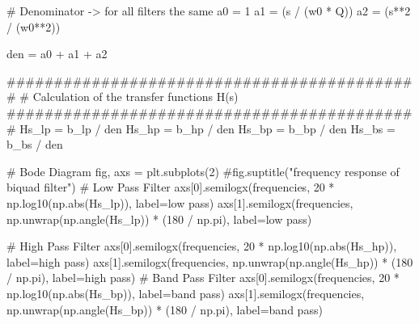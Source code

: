 \documentclass[
  letterpaper,
]{scrbook}
\newenvironment{Shaded}{}{}
\newcommand{\BuiltInTok}[1]{\textcolor[rgb]{0.84,0.23,0.29}{#1}}
\newcommand{\CommentTok}[1]{\textcolor[rgb]{0.42,0.45,0.49}{#1}}
\newcommand{\DecValTok}[1]{\textcolor[rgb]{0.00,0.36,0.77}{#1}}
\newcommand{\NormalTok}[1]{\textcolor[rgb]{0.14,0.16,0.18}{#1}}
\newcommand{\OperatorTok}[1]{\textcolor[rgb]{0.14,0.16,0.18}{#1}}
\newcommand{\StringTok}[1]{\textcolor[rgb]{0.01,0.18,0.38}{#1}}
\begin{document}
\begin{codelisting}
{\begin{Shaded}
\begin{Highlighting}[]
\CommentTok{\# Denominator {-}\textgreater{} for all filters the same}
\NormalTok{a0 }\OperatorTok{=} \DecValTok{1}
\NormalTok{a1 }\OperatorTok{=}\NormalTok{ (s }\OperatorTok{/}\NormalTok{ (w0 }\OperatorTok{*}\NormalTok{ Q))}
\NormalTok{a2 }\OperatorTok{=}\NormalTok{ (s}\OperatorTok{**}\DecValTok{2} \OperatorTok{/}\NormalTok{ (w0}\OperatorTok{**}\DecValTok{2}\NormalTok{))}

\NormalTok{den }\OperatorTok{=}\NormalTok{ a0 }\OperatorTok{+}\NormalTok{ a1 }\OperatorTok{+}\NormalTok{ a2}

\CommentTok{\#\#\#\#\#\#\#\#\#\#\#\#\#\#\#\#\#\#\#\#\#\#\#\#\#\#\#\#\#\#\#\#\#\#\#\#\#\#\#\#\#\#\#\#}
\CommentTok{\# Calculation of the transfer functions H(s)}
\CommentTok{\#\#\#\#\#\#\#\#\#\#\#\#\#\#\#\#\#\#\#\#\#\#\#\#\#\#\#\#\#\#\#\#\#\#\#\#\#\#\#\#\#\#\#\#}
\NormalTok{Hs\_lp }\OperatorTok{=}\NormalTok{ b\_lp }\OperatorTok{/}\NormalTok{ den}
\NormalTok{Hs\_hp }\OperatorTok{=}\NormalTok{ b\_hp }\OperatorTok{/}\NormalTok{ den}
\NormalTok{Hs\_bp }\OperatorTok{=}\NormalTok{ b\_bp }\OperatorTok{/}\NormalTok{ den}
\NormalTok{Hs\_bs }\OperatorTok{=}\NormalTok{ b\_bs }\OperatorTok{/}\NormalTok{ den}

\CommentTok{\# Bode Diagram}
\NormalTok{fig, axs }\OperatorTok{=}\NormalTok{ plt.subplots(}\DecValTok{2}\NormalTok{)}
\CommentTok{\#fig.suptitle("frequency response of biquad filter")}
\CommentTok{\textquotesingle{}\textquotesingle{}\textquotesingle{}}
\CommentTok{\# Low Pass Filter}
\CommentTok{axs[0].semilogx(frequencies, 20 * np.log10(np.abs(Hs\_lp)), label=\textquotesingle{}low pass\textquotesingle{})}
\CommentTok{axs[1].semilogx(frequencies, np.unwrap(np.angle(Hs\_lp)) * (180 / np.pi), label=\textquotesingle{}low pass\textquotesingle{})}

\CommentTok{\# High Pass Filter}
\CommentTok{axs[0].semilogx(frequencies, 20 * np.log10(np.abs(Hs\_hp)), label=\textquotesingle{}high pass\textquotesingle{})}
\CommentTok{axs[1].semilogx(frequencies, np.unwrap(np.angle(Hs\_hp)) * (180 / np.pi), label=\textquotesingle{}high pass\textquotesingle{})}
\CommentTok{\textquotesingle{}\textquotesingle{}\textquotesingle{}}
\CommentTok{\# Band Pass Filter}
\NormalTok{axs[}\DecValTok{0}\NormalTok{].semilogx(frequencies, }\DecValTok{20} \OperatorTok{*}\NormalTok{ np.log10(np.}\BuiltInTok{abs}\NormalTok{(Hs\_bp)), label}\OperatorTok{=}\StringTok{\textquotesingle{}band pass\textquotesingle{}}\NormalTok{)}
\NormalTok{axs[}\DecValTok{1}\NormalTok{].semilogx(frequencies, np.unwrap(np.angle(Hs\_bp)) }\OperatorTok{*}\NormalTok{ (}\DecValTok{180} \OperatorTok{/}\NormalTok{ np.pi), label}\OperatorTok{=}\StringTok{\textquotesingle{}band pass\textquotesingle{}}\NormalTok{)}


\end{Highlighting}
\end{Shaded}}
\end{codelisting}
\end{document}
